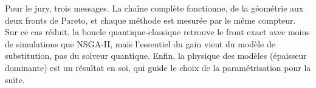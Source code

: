 \begin{projet}
Pour le jury, trois messages. La chaîne complète fonctionne, de la géométrie aux deux fronts de Pareto, et chaque méthode est mesurée par le même compteur. Sur ce cas réduit, la boucle quantique-classique retrouve le front exact avec moins de simulations que NSGA-II, mais l'essentiel du gain vient du modèle de substitution, pas du solveur quantique. Enfin, la physique des modèles (épaisseur dominante) est un résultat en soi, qui guide le choix de la paramétrisation pour la suite.
\end{projet}
